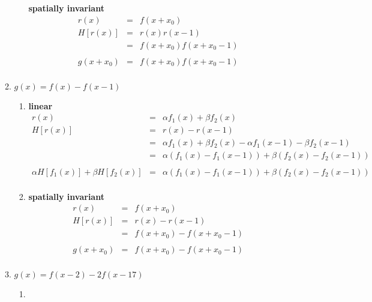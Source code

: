\documentclass[9pt]{article}
\begin{document}
\begin{enumerate}
\begin{enumerate}
\begin{enumerate}
            \textbf{spatially invariant}
            \begin{eqnarray*}
              r(x) &=& f(x + x_0) \\
              H[r(x)] &=& r(x)r(x-1) \\
                      &=& f(x + x_0)f(x + x_0 - 1) \\
              \\
              g(x + x_0) &=& f(x + x_0)f(x + x_0 - 1) \\
            \end{eqnarray*}
          \end{enumerate}
        \item
          $ g(x) = f(x) - f(x-1) $
          \begin{enumerate}
          \item
            \textbf{linear}
            \begin{eqnarray*}
              r(x) &=& \alpha f_1(x) + \beta f_2(x) \\
              H[r(x)] &=& r(x) - r(x-1) \\
                      &=& \alpha f_1(x) + \beta f_2(x) - \alpha f_1(x - 1)
                          - \beta f_2(x - 1) \\
                      &=& \alpha (f_1(x)-f_1(x-1)) + \beta (f_2(x)-f_2(x-1)) \\
              \\
              \alpha H[f_1(x)] + \beta H[f_2(x)]
                      &=& \alpha (f_1(x)-f_1(x-1)) + \beta (f_2(x)-f_2(x-1)) \\
            \end{eqnarray*}
          \item
            \textbf{spatially invariant}
            \begin{eqnarray*}
              r(x) &=& f(x + x_0) \\
              H[r(x)] &=& r(x) - r(x - 1) \\
                      &=& f(x + x_0) - f(x + x_0 - 1) \\
              \\
              g(x + x_0) &=& f(x + x_0) - f(x + x_0 - 1) \\
            \end{eqnarray*}
          \end{enumerate}
        \item
          $ g(x) = f(x-2) - 2f(x-17) $
          \begin{enumerate}
          \item

\end{enumerate}
\end{enumerate}
\end{enumerate}
\end{document}

